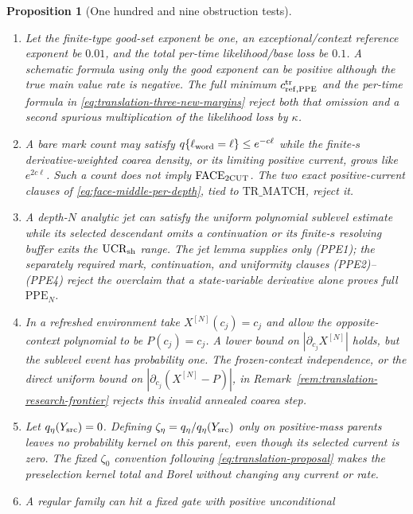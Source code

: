 \documentclass[11pt]{article}
\newtheorem{proposition}[theorem]{Proposition}
\begin{document}
\begin{proposition}[One hundred and nine obstruction tests]
\begin{enumerate}[label=\textup{(T\arabic*)}]
      $q$-pushforward domination \eqref{eq:propagated-q-physical-match},
      now part of $\mathrm{TR\_MATCH}$, rejects the model.
\item Let the finite-type good-set exponent be one, an exceptional/context
      reference exponent be $0.01$, and the total per-time likelihood/base
      loss be $0.1$.  A schematic formula using only the good exponent can
      be positive although the true main value rate is negative.  The full
      minimum $c_{{\rm ref},{\rm PPE}}^{\rm tr}$ and the per-time formula in
      \eqref{eq:translation-three-new-margins} reject both that omission and
      a second spurious multiplication of the likelihood loss by $\kappa$.
\item A bare mark count may satisfy
      $q\{\ell_{\rm word}=\ell\}\le e^{-c\ell}$ while the finite-$s$
      derivative-weighted coarea density, or its limiting positive current,
      grows like $e^{2c\ell}$.  Such a count does not imply
      $\mathrm{FACE}_{\rm 2CUT}$.  The two exact positive-current clauses of
      \eqref{eq:face-middle-per-depth}, tied to $\mathrm{TR\_MATCH}$, reject
      it.
\item A depth-$N$ analytic jet can satisfy the uniform polynomial sublevel
      estimate while its selected descendant omits a continuation or its
      finite-$s$ resolving buffer exits the $\mathrm{UCR}_{\rm sh}$ range.
      The jet lemma supplies only \textup{(PPE1)}; the separately required
      mark, continuation, and uniformity clauses \textup{(PPE2)--(PPE4)}
      reject the overclaim that a
      state-variable derivative alone proves full $\mathrm{PPE}_N$.
\item In a refreshed environment take $X^{[N]}(c_j)=c_j$ and allow the
      opposite-context polynomial to be $P(c_j)=c_j$.  A lower bound on
      $|\partial_{c_j}X^{[N]}|$ holds, but the sublevel event has probability
      one.  The frozen-context independence, or the direct uniform bound on
      $|\partial_{c_j}(X^{[N]}-P)|$, in
      Remark~\ref{rem:translation-research-frontier} rejects this invalid
      annealed coarea step.
\item Let $q_\eta(Y_{\rm src})=0$.  Defining
      $\zeta_\eta=q_\eta/q_\eta(Y_{\rm src})$ only on positive-mass parents
      leaves no probability kernel on this parent, even though its selected
      current is zero.  The fixed $\zeta_0$ convention following
      \eqref{eq:translation-proposal} makes the preselection kernel total and
      Borel without changing any current or rate.
\item A regular family can hit a fixed gate with positive unconditional

\end{enumerate}
\end{proposition}
\end{document}
